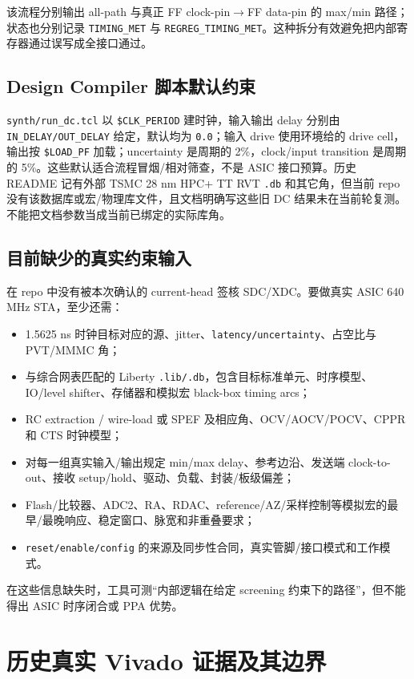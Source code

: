 \documentclass[UTF8,fontset=fandol,10pt,a4paper,openany]{ctexrep}
\newcommand{\code}[1]{\nolinkurl{#1}}
\begin{document}
该流程分别输出 all-path 与真正 FF clock-pin\ensuremath{\rightarrow}FF data-pin 的 max/min 路径；状态也分别记录 \code{TIMING_MET} 与 \code{REGREG_TIMING_MET}。这种拆分有效避免把内部寄存器通过误写成全接口通过。


\subsection{Design Compiler 脚本默认约束}


\code{synth/run_dc.tcl} 以 \code{$CLK_PERIOD} 建时钟，输入输出 delay 分别由 \code{IN_DELAY/OUT_DELAY} 给定，默认均为 \code{0.0}；输入 drive 使用环境给的 drive cell，输出按 \code{$LOAD_PF} 加载；uncertainty 是周期的 2\%，clock/input transition 是周期的 5\%。这些默认适合流程冒烟/相对筛查，不是 ASIC 接口预算。历史 README 记有外部 TSMC 28 nm HPC+ TT RVT \code{.db} 和其它角，但当前 repo 没有该数据库或宏/物理库文件，且文档明确写这些旧 DC 结果未在当前轮复测。不能把文档参数当成当前已绑定的实际库角。


\subsection{目前缺少的真实约束输入}


在 repo 中没有被本次确认的 current-head 签核 SDC/XDC。要做真实 ASIC 640 MHz STA，至少还需：


\begin{itemize}
\item 1.5625 ns 时钟目标对应的源、jitter、\code{latency/uncertainty}、占空比与 PVT/MMMC 角；
\item 与综合网表匹配的 Liberty \code{.lib/.db}，包含目标标准单元、时序模型、IO/level shifter、存储器和模拟宏 black-box timing arcs；
\item RC extraction / wire-load 或 SPEF 及相应角、OCV/AOCV/POCV、CPPR 和 CTS 时钟模型；
\item 对每一组真实输入/输出规定 min/max delay、参考边沿、发送端 clock-to-out、接收 setup/hold、驱动、负载、封装/板级偏差；
\item Flash/比较器、ADC2、RA、RDAC、reference/AZ/采样控制等模拟宏的最早/最晚响应、稳定窗口、脉宽和非重叠要求；
\item \code{reset/enable/config} 的来源及同步性合同，真实管脚/接口模式和工作模式。
\end{itemize}


在这些信息缺失时，工具可测“内部逻辑在给定 screening 约束下的路径”，但不能得出 ASIC 时序闭合或 PPA 优势。


\section{历史真实 Vivado 证据及其边界}
\end{document}
